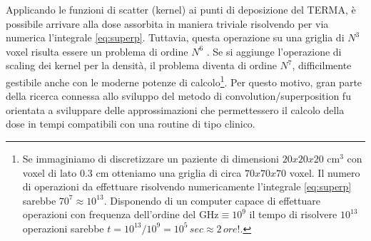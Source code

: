 {Applicando le funzioni di scatter (kernel) ai punti di deposizione del TERMA, è possibile arrivare alla dose assorbita in maniera triviale risolvendo per via numerica l'integrale \eqref{eq:superp}. Tuttavia, questa operazione su una griglia di $N^3$ voxel risulta essere un problema  di ordine $N^6$ \cite{Ahnesjo1999}. Se si aggiunge l'operazione di scaling dei kernel per la densità, il problema diventa di ordine $N^7$, difficilmente gestibile anche con le moderne potenze di calcolo\footnote{Se immaginiamo di discretizzare un paziente di dimensioni $20x20x20$ cm$^3$ con voxel di lato $0.3$ cm otteniamo una griglia di circa $70x70x70$ voxel. Il numero di operazioni da effettuare risolvendo numericamente l'integrale \eqref{eq:superp} sarebbe $70^7\approx 10^{13}$. Disponendo di un computer capace di effettuare operazioni con frequenza dell'ordine del GHz$\equiv 10^9$ il tempo di risolvere $10^{13}$ operazioni sarebbe $t=10^{13}/10^9=10^5\,sec\approx 2\, ore!$.}. Per questo motivo, gran parte della ricerca connessa allo sviluppo del metodo di convolution/superposition fu orientata a sviluppare delle approssimazioni che permettessero il calcolo della dose in tempi compatibili con una routine di tipo clinico.

}
